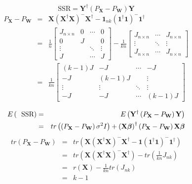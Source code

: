 \documentclass{article}
\begin{document}
\bigskip

\begin{equation*}
\text{SSR}=\mathbf{Y}^{\dagger }\left( P_{\mathbf{X}}-P_{\mathbf{W}}\right) 
\mathbf{Y}
\end{equation*}%
\begin{eqnarray*}
P_{\mathbf{X}}-P_{\mathbf{W}} &=&\mathbf{X}\left( \mathbf{X}^{\dagger }%
\mathbf{X}\right) ^{-}\mathbf{X}^{\dagger }-\mathbf{1}_{nk}\left( \mathbf{1}%
^{\dagger }\mathbf{1}\right) ^{-}\mathbf{1}^{\dagger } \\
&=&\frac{1}{n}\left[ 
\begin{array}{cccc}
J_{n\times n} & 0 & \cdots  & 0 \\ 
0 & J &  & 0 \\ 
\vdots  &  & \ddots  & \vdots  \\ 
J &  & \cdots  & J%
\end{array}%
\right] -\frac{1}{kn}\left[ 
\begin{array}{ccc}
J_{n\times n} & \cdots  & J_{n\times n} \\ 
\vdots  & \ddots  & \vdots  \\ 
J_{n\times n} & \cdots  & J_{n\times n}%
\end{array}%
\right]  \\
&=&\frac{1}{kn}\left[ 
\begin{array}{cccc}
\left( k-1\right) J & -J & \cdots  & -J \\ 
-J & \left( k-1\right) J &  & \vdots  \\ 
\vdots  & \vdots  & \ddots  & \vdots  \\ 
-J & -J & \cdots  & \left( k-1\right) J%
\end{array}%
\right] 
\end{eqnarray*}

\begin{eqnarray*}
E\left( \text{SSR}\right)  &=&E\left( \mathbf{Y}^{\dagger }\left( P_{\mathbf{%
X}}-P_{\mathbf{W}}\right) \mathbf{Y}\right)  \\
&=&tr\left( \left( P_{\mathbf{X}}-P_{\mathbf{W}}\right) \sigma ^{2}I\right)
+\left( \mathbf{X\beta }\right) ^{\dagger }\left( P_{\mathbf{X}}-P_{\mathbf{W%
}}\right) \mathbf{X\beta }
\end{eqnarray*}%
\begin{eqnarray*}
tr\left( P_{\mathbf{X}}-P_{\mathbf{W}}\right)  &=&tr\left( \mathbf{X}\left( 
\mathbf{X}^{\dagger }\mathbf{X}\right) ^{-}\mathbf{X}^{\dagger }-\mathbf{1}%
\left( \mathbf{1}^{\dagger }\mathbf{1}\right) ^{-}\mathbf{1}^{\dagger
}\right)  \\
&=&tr\left( \mathbf{X}\left( \mathbf{X}^{\dagger }\mathbf{X}\right) ^{-}%
\mathbf{X}^{\dagger }\right) -tr\left( \frac{1}{kn}J_{nk}\right)  \\
&=&r\left( \mathbf{X}\right) -\frac{1}{kn}tr\left( J_{nk}\right)  \\
&=&k-1
\end{eqnarray*}
\end{document}
